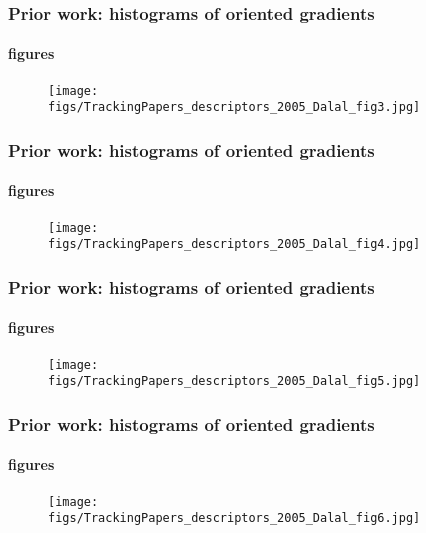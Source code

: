 \begin{frame}
\frametitle{Prior work: histograms of oriented gradients}
\framesubtitle{figures}
\mypagenum
{}
	\begin{figure}
		\texttt{[image: figs/TrackingPapers\_descriptors\_2005\_Dalal\_fig3.jpg]}
	\end{figure}
\end{frame}



\begin{frame}
\frametitle{Prior work: histograms of oriented gradients}
\framesubtitle{figures}
\mypagenum
{}
	\begin{figure}
		\texttt{[image: figs/TrackingPapers\_descriptors\_2005\_Dalal\_fig4.jpg]}
	\end{figure}
\end{frame}



\begin{frame}
\frametitle{Prior work: histograms of oriented gradients}
\framesubtitle{figures}
\mypagenum
{}
	\begin{figure}
		\texttt{[image: figs/TrackingPapers\_descriptors\_2005\_Dalal\_fig5.jpg]}
	\end{figure}
\end{frame}



\begin{frame}
\frametitle{Prior work: histograms of oriented gradients}
\framesubtitle{figures}
\mypagenum
{}
	\begin{figure}
		\texttt{[image: figs/TrackingPapers\_descriptors\_2005\_Dalal\_fig6.jpg]}
	\end{figure}
\end{frame}




\printbibliography

